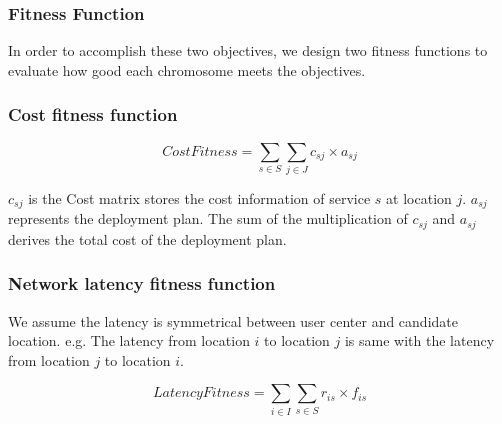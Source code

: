 \documentclass{llncs}
\begin{document}
\subsubsection{Fitness Function}

\begin{flushleft}In order to accomplish these two objectives, we design two fitness functions to evaluate 
how good each chromosome meets the objectives.\end{flushleft}
\subsubsection{Cost fitness function}

\begin{equation}
		CostFitness = \sum\limits_{s \in S} \sum\limits_{j \in J} c_{sj} \times a_{sj}
\end{equation}

$c_{sj}$ is the Cost matrix stores the cost information of service $s$ at location $j$. $a_{sj}$ represents the deployment plan. The sum of the multiplication of 
$c_{sj}$ and $a_{sj}$ derives the total cost of the deployment plan.



\subsubsection{Network latency fitness function}

We assume the latency is symmetrical between user center and candidate location. e.g. 
The latency from location $i$ to location $j$ is same with the latency from location $j$ to location $i$.

	\begin{equation}
		LatencyFitness = \sum\limits_{i \in I} \sum\limits_{s \in S} r_{is} \times f_{is}
	\end{equation}

\end{document}
